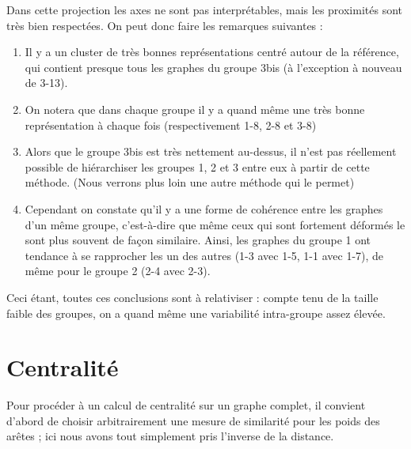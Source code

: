 \documentclass[a4paper]{article}
\begin{document}
Dans cette projection les axes ne sont pas interprétables, mais les proximités sont très bien respectées. On peut donc faire les remarques suivantes :
\begin{enumerate}
	\item Il y a un cluster de très bonnes représentations centré autour de la référence, qui contient presque tous les graphes du groupe 3bis (à l'exception à nouveau de 3-13).
	\item On notera que dans chaque groupe il y a quand même une très bonne représentation à chaque fois (respectivement 1-8, 2-8 et 3-8)
	\item Alors que le groupe 3bis est très nettement au-dessus, il n'est pas réellement possible de hiérarchiser les groupes 1, 2 et 3 entre eux à partir de cette méthode. (Nous verrons plus loin une autre méthode qui le permet)
	\item Cependant on constate qu'il y a une forme de cohérence entre les graphes d'un même groupe, c'est-à-dire que même ceux qui sont fortement déformés le sont plus souvent de façon similaire. Ainsi, les graphes du groupe 1 ont tendance à se rapprocher les un des autres (1-3 avec 1-5, 1-1 avec 1-7), de même pour le groupe 2 (2-4 avec 2-3).
\end{enumerate}

Ceci étant, toutes ces conclusions sont à relativiser : compte tenu de la taille faible des groupes, on a quand même une variabilité intra-groupe assez élevée.

\section{Centralité}

Pour procéder à un calcul de centralité sur un graphe complet, il convient d'abord de choisir arbitrairement une mesure de similarité pour les poids des arêtes ; ici nous avons tout simplement pris l'inverse de la distance.\\
\end{document}
